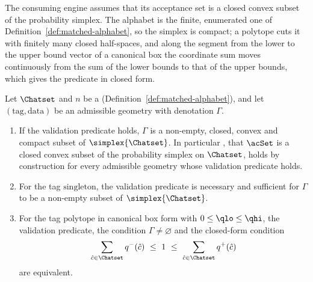 
The consuming engine assumes that its acceptance set is a closed convex subset
of the probability simplex. The alphabet is the finite, enumerated one of
Definition~\ref{def:matched-alphabet}, so the simplex is compact; a polytope cuts it
with finitely many closed half-spaces, and along the segment from the lower to
the upper bound vector of a canonical box the coordinate sum moves
continuously from the sum of the lower bounds to that of the upper bounds,
which gives the predicate in closed form.

\begin{theorem}\label{thm:geometry-validation}
Let $\Chatset$ and $n$ be a 
(Definition~\ref{def:matched-alphabet}), and let $(\text{tag},\text{data})$
be an admissible geometry with denotation $\Gamma$.
\begin{enumerate}[label=(\roman*),leftmargin=2.2em]
\item If the validation predicate holds, $\Gamma$ is a non-empty, closed,
convex and compact subset of $\simplex{\Chatset}$. In particular
, that $\acSet$ is a closed convex subset of the
probability simplex on $\Chatset$, holds by construction for every admissible
geometry whose validation predicate holds.
\item For the tag $\mathrm{singleton}$, the validation predicate is necessary
and sufficient for $\Gamma$ to be a non-empty subset of $\simplex{\Chatset}$.
\item For the tag $\mathrm{polytope}$ in canonical box form with
$0\le\qlo\le\qhi$, the validation predicate, the condition
$\Gamma\neq\varnothing$ and the closed-form condition
\begin{equation}\label{eq:boxfeas}
  \sum_{\hat c\in\Chatset}q^{-}(\hat c)\ \le\ 1\ \le\
  \sum_{\hat c\in\Chatset}q^{+}(\hat c)
\end{equation}
are equivalent.
\end{enumerate}
\end{theorem}


